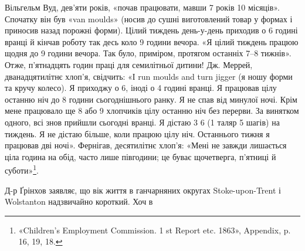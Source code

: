 Вільгельм Вуд, дев’яти років, «почав працювати, мавши
7 років 10 місяців». Спочатку він був «van moulds» (носив до
сушні виготовлений товар у формах і приносив назад порожні
форми). Цілий тиждень день-у-день приходив о 6 годині вранці
й кінчав роботу так десь коло 9 години вечора. «Я цілий тиждень
працюю щодня до 9 години вечора. Так було, приміром, протягом
останніх 7--8 тижнів». Отже, п’ятнадцять годин праці для семилітньої
дитини! Дж. Меррей, дванадцятилітнє хлоп’я, свідчить:
«І run moulds and turn jigger (я ношу форми та кручу колесо).
Я приходжу о 6, іноді о 4 годині вранці. Я працював цілу останню
ніч до 8 години сьогоднішнього ранку. Я не спав від минулої
ночі. Крім мене працювало ще 8 або 9 хлопчиків цілу останню
ніч без перерви. За винятком одного, всі знов прийшли сьогодні
вранці. Я дістаю 3 6 (1 таляр 5 шагів) на тиждень.
Я не дістаю більше, коли працюю цілу ніч. Останнього тижня
я працював дві ночі». Фернігав, десятилітнє хлоп’я: «Мені не
завжди лишається ціла година на обід, часто лише півгодини;
це буває щочетверга, п’ятниці й суботи»\footnote{«Children’s Employment Commission. 1 st Report etc. 1863», Appendix,
p. 16, 19, 18.
}.

Д-р Ґрінхов заявляє, що вік життя в ганчарняних округах
Stoke-upon-Trent і Wolstanton надзвичайно короткий. Хоч в
\parbreak{}  %
